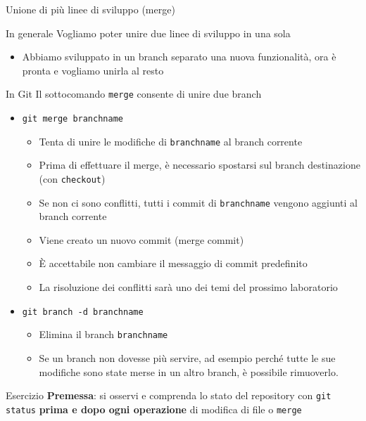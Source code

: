 \documentclass[xcolor=dvipsnames,presentation]{beamer}
\begin{document}
\begin{frame}{Unione di più linee di sviluppo (merge)}
    \begin{block}{In generale}
        Vogliamo poter unire due linee di sviluppo in una sola
        \begin{itemize}
            \item Abbiamo sviluppato in un branch separato una nuova funzionalità, ora è pronta e vogliamo unirla al resto
        \end{itemize}
    \end{block}
    \begin{block}{In Git}
        Il sottocomando \texttt{merge} consente di unire due branch
        \begin{itemize}
            \item \texttt{git merge branchname}
            \begin{itemize}
                \item Tenta di unire le modifiche di \texttt{branchname} al branch corrente
                \item Prima di effettuare il merge, è necessario spostarsi sul branch destinazione (con \texttt{checkout})
                \item Se non ci sono conflitti, tutti i commit di \texttt{branchname} vengono aggiunti al branch corrente
                \item Viene creato un nuovo commit (merge commit)
                \item È accettabile non cambiare il messaggio di commit predefinito
                \item La risoluzione dei conflitti sarà uno dei temi del prossimo laboratorio
            \end{itemize}
            \item \texttt{git branch -d branchname}
            \begin{itemize}
                \item Elimina il branch \texttt{branchname}
                \item Se un branch non dovesse più servire, ad esempio perché tutte le sue modifiche sono state merse in un altro branch, è possibile rimuoverlo.
            \end{itemize}
        \end{itemize}
    \end{block}
    \begin{block}{Esercizio}
        \textbf{Premessa}: si osservi e comprenda lo stato del repository con \texttt{git status} \textbf{prima e dopo ogni operazione} di modifica di file o \texttt{merge}

\end{block}
\end{frame}
\end{document}
